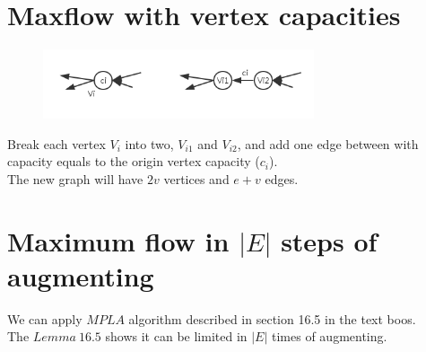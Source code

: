 \documentclass[a4paper]{article}
\begin{document}
\begin{spacing}{1.3}
\section*{Maxflow with vertex capacities}
\begin{multicols}{2}
\begin{figure}[H]
    \centering
    \includegraphics[width=8cm]{11-2.png}
\end{figure}
Break each vertex $V_i$ into two, $V_{i1}$ and $V_{i2}$,  and add one edge between with capacity equals to the origin vertex capacity ($c_i$).
\\The new graph will have $2v$ vertices and $e+v$ edges.
\end{multicols}

\section*{Maximum flow in $\left|E\right|$ steps of augmenting}
We can apply $MPLA$ algorithm described in section 16.5 in the text boos.
\\The $Lemma\ 16.5$ shows it can be limited in $\left|E\right|$ times of augmenting.
\end{spacing}
\end{document}
